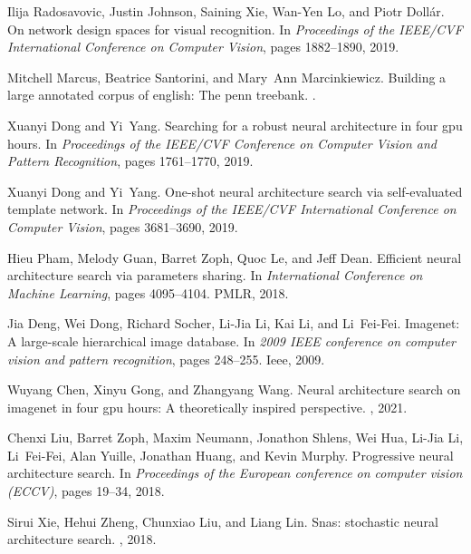\documentclass{article}
\begin{document}
\begin{thebibliography}{10}
Ilija Radosavovic, Justin Johnson, Saining Xie, Wan-Yen Lo, and Piotr
  Doll{\'a}r.
\newblock On network design spaces for visual recognition.
\newblock In {\em Proceedings of the IEEE/CVF International Conference on
  Computer Vision}, pages 1882--1890, 2019.

Mitchell Marcus, Beatrice Santorini, and Mary~Ann Marcinkiewicz.
\newblock Building a large annotated corpus of english: The penn treebank.
.

Xuanyi Dong and Yi~Yang.
\newblock Searching for a robust neural architecture in four gpu hours.
\newblock In {\em Proceedings of the IEEE/CVF Conference on Computer Vision and
  Pattern Recognition}, pages 1761--1770, 2019.

Xuanyi Dong and Yi~Yang.
\newblock One-shot neural architecture search via self-evaluated template
  network.
\newblock In {\em Proceedings of the IEEE/CVF International Conference on
  Computer Vision}, pages 3681--3690, 2019.

Hieu Pham, Melody Guan, Barret Zoph, Quoc Le, and Jeff Dean.
\newblock Efficient neural architecture search via parameters sharing.
\newblock In {\em International Conference on Machine Learning}, pages
  4095--4104. PMLR, 2018.

Jia Deng, Wei Dong, Richard Socher, Li-Jia Li, Kai Li, and Li~Fei-Fei.
\newblock Imagenet: A large-scale hierarchical image database.
\newblock In {\em 2009 IEEE conference on computer vision and pattern
  recognition}, pages 248--255. Ieee, 2009.

Wuyang Chen, Xinyu Gong, and Zhangyang Wang.
\newblock Neural architecture search on imagenet in four gpu hours: A
  theoretically inspired perspective.
, 2021.

Chenxi Liu, Barret Zoph, Maxim Neumann, Jonathon Shlens, Wei Hua, Li-Jia Li,
  Li~Fei-Fei, Alan Yuille, Jonathan Huang, and Kevin Murphy.
\newblock Progressive neural architecture search.
\newblock In {\em Proceedings of the European conference on computer vision
  (ECCV)}, pages 19--34, 2018.

Sirui Xie, Hehui Zheng, Chunxiao Liu, and Liang Lin.
\newblock Snas: stochastic neural architecture search.
, 2018.


\end{thebibliography}
\end{document}
